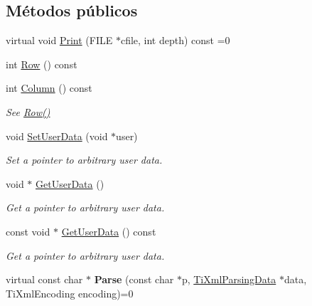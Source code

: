 \subsection*{Métodos públicos}
\begin{DoxyCompactItemize}
\item 
virtual void \hyperlink{class_ti_xml_base_a0de56b3f2ef14c65091a3b916437b512}{Print} (F\-I\-L\-E $\ast$cfile, int depth) const =0
\item 
int \hyperlink{class_ti_xml_base_a024bceb070188df92c2a8d8852dd0853}{Row} () const 
\item 
\hypertarget{class_ti_xml_base_ab54bfb9b70fe6dd276e7b279cab7f003}{int \hyperlink{class_ti_xml_base_ab54bfb9b70fe6dd276e7b279cab7f003}{Column} () const }\label{class_ti_xml_base_ab54bfb9b70fe6dd276e7b279cab7f003}

\begin{DoxyCompactList}\small\item\em See \hyperlink{class_ti_xml_base_a024bceb070188df92c2a8d8852dd0853}{Row()} \end{DoxyCompactList}\item 
\hypertarget{class_ti_xml_base_ac6b3e0f790930d4970ec30764e937b5d}{void \hyperlink{class_ti_xml_base_ac6b3e0f790930d4970ec30764e937b5d}{Set\-User\-Data} (void $\ast$user)}\label{class_ti_xml_base_ac6b3e0f790930d4970ec30764e937b5d}

\begin{DoxyCompactList}\small\item\em Set a pointer to arbitrary user data. \end{DoxyCompactList}\item 
\hypertarget{class_ti_xml_base_a6559a530ca6763fc301a14d77ed28c17}{void $\ast$ \hyperlink{class_ti_xml_base_a6559a530ca6763fc301a14d77ed28c17}{Get\-User\-Data} ()}\label{class_ti_xml_base_a6559a530ca6763fc301a14d77ed28c17}

\begin{DoxyCompactList}\small\item\em Get a pointer to arbitrary user data. \end{DoxyCompactList}\item 
\hypertarget{class_ti_xml_base_ad0120210e4680ef2088601753ce0ede4}{const void $\ast$ \hyperlink{class_ti_xml_base_ad0120210e4680ef2088601753ce0ede4}{Get\-User\-Data} () const }\label{class_ti_xml_base_ad0120210e4680ef2088601753ce0ede4}

\begin{DoxyCompactList}\small\item\em Get a pointer to arbitrary user data. \end{DoxyCompactList}\item 
\hypertarget{class_ti_xml_base_a00e4edb0219d00a1379c856e5a1d2025}{virtual const char $\ast$ {\bfseries Parse} (const char $\ast$p, \hyperlink{class_ti_xml_parsing_data}{Ti\-Xml\-Parsing\-Data} $\ast$data, Ti\-Xml\-Encoding encoding)=0}\label{class_ti_xml_base_a00e4edb0219d00a1379c856e5a1d2025}

\end{DoxyCompactItemize}
